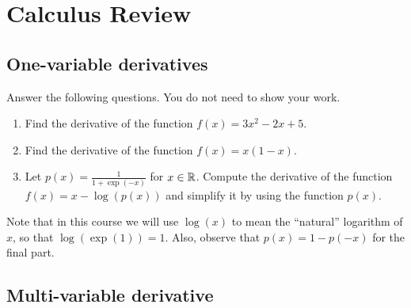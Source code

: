     \newpage

    \section{Calculus Review }
    
    \subsection{One-variable derivatives}

    Answer the following questions. You do not need to show your work.

    \begin{enumerate}
        \item Find the derivative of the function $f(x) = 3x^2 -2x + 5$.
        
        \item Find the derivative of the function $f(x) = x(1-x)$.
        
        \item Let $p(x) = \frac{1}{1+\exp(-x)}$ for $x \in \mathbb{R}$. Compute the derivative of the function $f(x) = x-\log(p(x))$ and simplify it by using the function $p(x)$.
    \end{enumerate}
    Note that in this course we will use $\log(x)$ to mean the ``natural'' logarithm of $x$, so that $\log(\exp(1)) = 1$. Also, observe that $p(x) = 1-p(-x)$ for the final part.

    \subsection{Multi-variable derivative}


